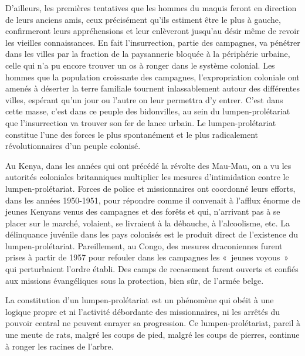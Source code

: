 \documentclass[french,twoside]{book} %
\begin{document}
D’ailleurs, les premières tentatives que les hommes du maquis feront en direction de leurs anciens amis, ceux précisément qu’ils estiment être le plus à gauche, confirmeront leurs appréhensions et leur enlèveront jusqu’au désir même de revoir les vieilles connaissances. En fait l’insurrection, partie des campagnes, va pénétrer dans les villes par la fraction de la paysannerie bloquée à la périphérie urbaine, celle qui n’a pu encore trouver un os à ronger dans le système colonial. Les hommes que la population croissante des campagnes, l’expropriation coloniale ont amenés à déserter la terre familiale tournent inlassablement autour des différentes villes, espérant qu’un jour ou l’autre on leur permettra d’y entrer. C’est dans cette masse, c’est dans ce peuple des bidonvilles, au sein du lumpen-prolétariat que l’insurrection va trouver son fer de lance urbain. Le lumpen-prolétariat constitue l’une des forces le plus spontanément et le plus radicalement révolutionnaires d’un peuple colonisé.\par
\bigbreak
\noindent Au Kenya, dans les années qui ont précédé la révolte des Mau-Mau, on a vu les autorités coloniales britanniques multiplier les mesures d’intimidation contre le lumpen-prolétariat. Forces de police et missionnaires ont coordonné leurs efforts, dans les années 1950-1951, pour répondre comme il convenait à l’afflux énorme de jeunes Kenyans venus des campagnes et des forêts et qui, n’arrivant pas à se placer sur le marché, volaient, se livraient à la débauche, à l’alcoolisme, etc. La délinquance juvénile dans les pays colonisés est le produit direct de l’existence   du lumpen-prolétariat. Pareillement, au Congo, des mesures draconiennes furent prises à partir de 1957 pour refouler dans les campagnes les « jeunes voyous » qui perturbaient l’ordre établi. Des camps de recasement furent ouverts et confiés aux missions évangéliques sous la protection, bien sûr, de l’armée belge.\par
La constitution d’un lumpen-prolétariat est un phénomène qui obéit à une logique propre et ni l’activité débordante des missionnaires, ni les arrêtés du pouvoir central ne peuvent enrayer sa progression. Ce lumpen-prolétariat, pareil à une meute de rats, malgré les coups de pied, malgré les coups de pierres, continue à ronger les racines de l’arbre.\par
\end{document}
